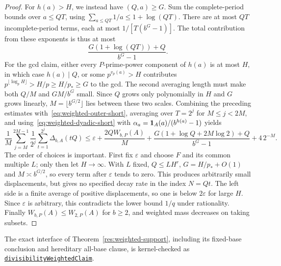 \documentclass[11pt]{article}
\begin{document}
\begin{proof}
For $h(a)>H$, we instead have $(Q,a)\ge G$.  Sum the complete-period
bounds over $a\le QT$, using $\sum_{a\le QT}1/a\le1+\log(QT)$.
There are at most $QT$ incomplete-period terms, each at most
$1/[T(b^G-1)]$.  The total contribution from these exponents is thus at most
\[
 \frac{G(1+\log(QT))+Q}{b^G-1}.
\]
For the gcd claim, either every $P$-prime-power component of $h(a)$ is at
most $H$, in which case $h(a)\mid Q$, or some $p^{v_p(a)}>H$ contributes
$p^{\lfloor\log_pH\rfloor}>H/p\ge H/p_*\ge G$ to the gcd.
The second averaging length must make both $Q/M$ and $GM/b^G$
small.  Since $Q$ grows only polynomially in $H$ and $G$ grows linearly,
$M=\lfloor b^{G/2}\rfloor$ lies between these two scales.
Combining the preceding estimates with~\eqref{eq:weighted-outer-short},
averaging over $T=2^j$ for $M\le j<2M$, and
using~\eqref{eq:weighted-dyadic-short} with
$\alpha_a={\bf1}_A(a)/(b^{h(a)}-1)$ yields
\begin{equation}\label{eq:weighted-main-bound}
 \frac1M\sum_{j=M}^{2M-1}\frac1{2^j}
 \sum_{t=1}^{2^j}\Delta_{b,A}(tQ)
 \le \varepsilon+\frac{2QW_{b,P}(A)}M
 +\frac{G(1+\log Q+2M\log2)+Q}{b^G-1}+4\,2^{-M}.
\end{equation}
The order of choices is important.  First fix $\varepsilon$ and choose
$F$ and its common multiple $L$; only then let $H\to\infty$.  With $L$ fixed,
$Q\le LH^r$, $G=H/p_*+O(1)$ and $M\asymp b^{G/2}$, so every term after
$\varepsilon$ tends to zero.  This produces arbitrarily small displacements, but gives no specified
decay rate in the index $N=Qt$.  The left side is a finite average of positive
displacements, so one is below $2\varepsilon$ for large $H$.
Since $\varepsilon$ is arbitrary, this contradicts the lower bound $1/q$
under rationality.  Finally
$W_{b,P}(A)\le W_{2,P}(A)$ for $b\ge2$, and weighted mass decreases on taking
subsets.
\end{proof}

The exact interface of Theorem~\ref{res:weighted-support}, including its
fixed-base conclusion and hereditary all-base clause, is kernel-checked as
\href{https://github.com/wcook04/plectis-erdos/blob/065e09523286894dfb57ba205e69666843817009/lean/ErdosProblems/Erdos257/PaperCompleteR8/WeightedReturn.lean#L99}{\texttt{divisibilityWeightedClaim}}.
\end{document}
